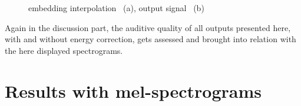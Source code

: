 \begin{figure}[htb!]
    \centering
    \caption{embedding interpolation ~(a), output signal ~(b)}
    \label{fig:res_triple_str_2D_inter_output}
\end{figure}

Again in the discussion part, the auditive quality of all outputs presented here, with and without energy correction, gets assessed and brought into relation with the here displayed spectrograms.

\section{Results with mel-spectrograms}

